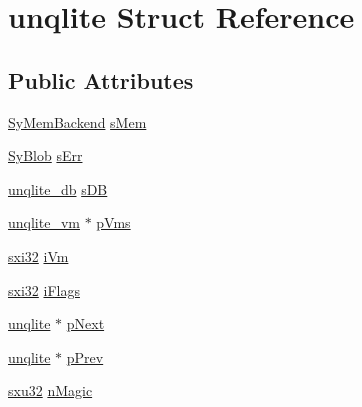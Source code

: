 \hypertarget{structunqlite}{\section{unqlite Struct Reference}
\label{d6/d0c/structunqlite}
}
\subsection*{Public Attributes}
\begin{DoxyCompactItemize}
\item 
\hyperlink{struct_sy_mem_backend}{Sy\-Mem\-Backend} \hyperlink{structunqlite_a502b27aa1d66ab429f7048adf43669cd}{s\-Mem}
\item 
\hyperlink{struct_sy_blob}{Sy\-Blob} \hyperlink{structunqlite_a741906f273a1b0ef7a748c45ad653a93}{s\-Err}
\item 
\hyperlink{structunqlite__db}{unqlite\-\_\-db} \hyperlink{structunqlite_aa57bcec2471c4870913bf69db8374180}{s\-D\-B}
\item 
\hyperlink{structunqlite__vm}{unqlite\-\_\-vm} $\ast$ \hyperlink{structunqlite_a5a854d6e7998deadc1d814074be94eca}{p\-Vms}
\item 
\hyperlink{unqlite_8c_a5a58035d4ae379178e2ca46cc3272fc5}{sxi32} \hyperlink{structunqlite_a61dd67f9b7db767b39b48ee6e6fec303}{i\-Vm}
\item 
\hyperlink{unqlite_8c_a5a58035d4ae379178e2ca46cc3272fc5}{sxi32} \hyperlink{structunqlite_a72c4bc974bb5d4c1271dc231cae4269e}{i\-Flags}
\item 
\hyperlink{structunqlite}{unqlite} $\ast$ \hyperlink{structunqlite_af2af5cb2ac50b1b6cc62aee179775dce}{p\-Next}
\item 
\hyperlink{structunqlite}{unqlite} $\ast$ \hyperlink{structunqlite_a074417d2b7bef440b8c25e4c9f267464}{p\-Prev}
\item 
\hyperlink{unqlite_8c_abc5a8a3f345c200c98c485551f49666e}{sxu32} \hyperlink{structunqlite_ae0f2f069bbe3f4056375f0d9ef15084e}{n\-Magic}
\end{DoxyCompactItemize}


